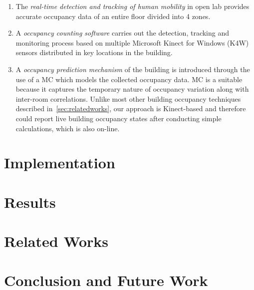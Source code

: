 \documentclass{sig-alternate}
\begin{document}
\begin{enumerate}
\item  The \textit{real-time detection and tracking of human mobility}
  in open lab provides accurate occupancy data of an entire floor
  divided into 4 zones.
\item  A \textit{occupancy counting software} carries out the detection,
  tracking and monitoring process based on multiple Microsoft Kinect
  for Windows (K4W) sensors distributed in key locations in the
  building.
\item A \textit{occupancy prediction mechanism} of the building is
  introduced through the use of a MC which models the
  collected occupancy data.  MC is a suitable because it captures the
  temporary nature of occupancy variation along with inter-room
  correlations. Unlike most other building occupancy techniques
  described in~\ref{sec:relatedworks}, our approach is Kinect-based
  and therefore could report live building occupancy states after
  conducting simple calculations, which is also on-line.
\end{enumerate}
\par






\section{Implementation}
\label{sec:implementation}





\section{Results}
\label{sec:results}





\section{Related Works}
\label{sec:related-works}




\section{Conclusion and Future Work}
\label{sec:concl-future-work}












\end{document}
